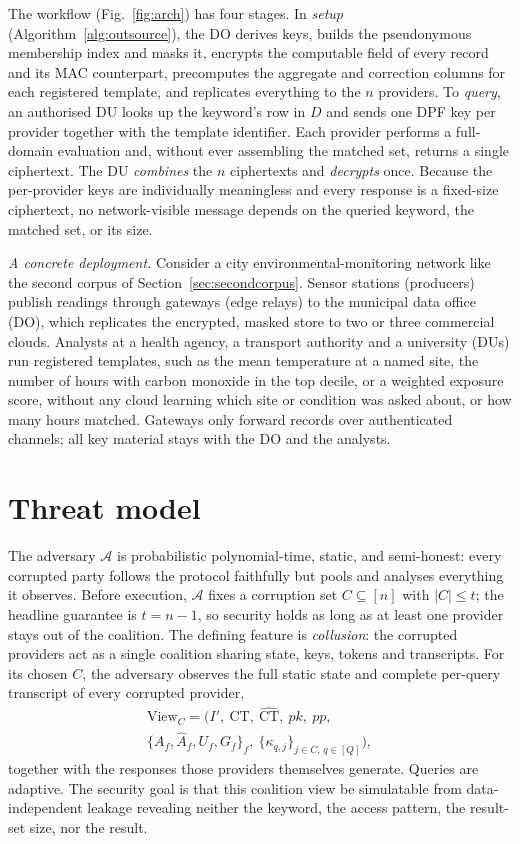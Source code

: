 \documentclass[a4paper,fleqn]{cas-dc}
\newcommand{\Adv}{\mathcal{A}}
\begin{document}
The workflow (Fig.~\ref{fig:arch}) has four stages. In \emph{setup}
(Algorithm~\ref{alg:outsource}), the DO derives keys, builds the pseudonymous
membership index and masks it, encrypts the computable field of every record
and its MAC counterpart, precomputes the aggregate and correction columns for
each registered template, and replicates everything to the $n$ providers. To
\emph{query}, an authorised DU looks up the keyword's row in $D$ and sends one
DPF key per provider together with the template identifier. Each provider
performs a full-domain evaluation and, without ever assembling the matched
set, returns a single ciphertext. The DU \emph{combines} the $n$ ciphertexts
and \emph{decrypts} once. Because the per-provider keys are individually
meaningless and every response is a fixed-size ciphertext, no
network-visible message depends on the queried keyword, the matched set, or
its size.

\emph{A concrete deployment.} Consider a city environmental-monitoring network
like the second corpus of Section~\ref{sec:secondcorpus}. Sensor stations
(producers) publish readings through gateways (edge relays) to the municipal
data office (DO), which replicates the encrypted, masked store to two or three
commercial clouds. Analysts at a health agency, a transport authority and a
university (DUs) run registered templates, such as the mean temperature at a
named site, the number of hours with carbon monoxide in the top decile, or a
weighted exposure score, without any cloud learning which site or condition
was asked about, or how many hours matched. Gateways only forward records over
authenticated channels; all key material stays with the DO and the analysts.

\section{Threat model}
\label{sec:threat}

The adversary $\Adv$ is probabilistic polynomial-time, static, and
semi-honest: every corrupted party follows the protocol faithfully but pools
and analyses everything it observes. Before execution, $\Adv$ fixes a
corruption set $C\subseteq[n]$ with $|C|\le t$; the headline guarantee is
$t=n-1$, so security holds as long as at least one provider stays out of the
coalition. The defining feature is \emph{collusion}: the corrupted providers
act as a single coalition sharing state, keys, tokens and transcripts. For its
chosen $C$, the adversary observes the full static state and complete
per-query transcript of every corrupted provider,
\begin{multline*}
\mathrm{View}_C = \big( I',\ \text{CT},\ \widehat{\text{CT}},\ pk,\ pp,\\
\{A_f,\widehat{A}_f,U_f,G_f\}_f,\
\{\kappa_{q,j}\}_{j\in C,\,q\in[Q]} \big),
\end{multline*}
together with the responses those providers themselves generate. Queries are
adaptive. The security goal is that this coalition view be simulatable from
data-independent leakage revealing neither the keyword, the access pattern,
the result-set size, nor the result.
\end{document}

